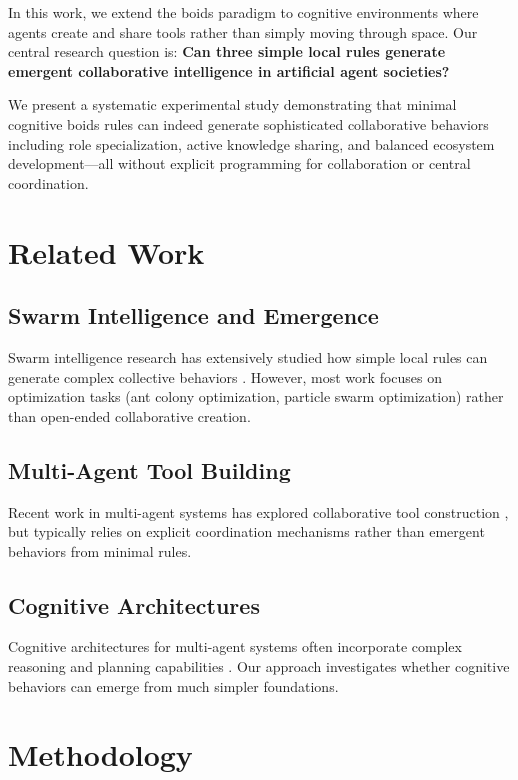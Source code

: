 \documentclass[10pt,twocolumn]{article}
\begin{document}
In this work, we extend the boids paradigm to cognitive environments where agents create and share tools rather than simply moving through space. Our central research question is: \textbf{Can three simple local rules generate emergent collaborative intelligence in artificial agent societies?}

We present a systematic experimental study demonstrating that minimal cognitive boids rules can indeed generate sophisticated collaborative behaviors including role specialization, active knowledge sharing, and balanced ecosystem development—all without explicit programming for collaboration or central coordination.

\section{Related Work}

\subsection{Swarm Intelligence and Emergence}
Swarm intelligence research has extensively studied how simple local rules can generate complex collective behaviors \cite{bonabeau1999swarm}. However, most work focuses on optimization tasks (ant colony optimization, particle swarm optimization) rather than open-ended collaborative creation.

\subsection{Multi-Agent Tool Building}
Recent work in multi-agent systems has explored collaborative tool construction \cite{lample2022hypertree}, but typically relies on explicit coordination mechanisms rather than emergent behaviors from minimal rules.

\subsection{Cognitive Architectures}
Cognitive architectures for multi-agent systems often incorporate complex reasoning and planning capabilities \cite{laird2012soar}. Our approach investigates whether cognitive behaviors can emerge from much simpler foundations.

\section{Methodology}
\end{document}
